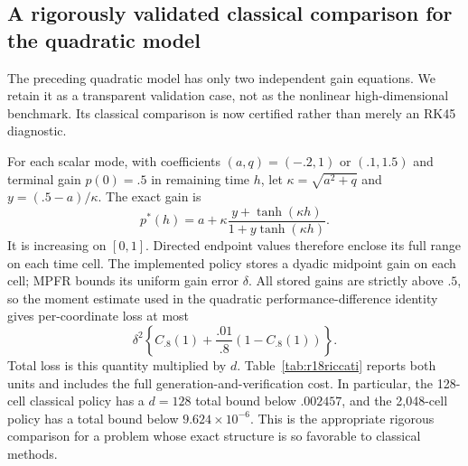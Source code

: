 \subsection{A rigorously validated classical comparison for the quadratic model}\label{sec:validatedriccati}
The preceding quadratic model has only two independent gain equations. We retain it as a transparent validation case, not as the nonlinear high-dimensional benchmark. Its classical comparison is now certified rather than merely an RK45 diagnostic.

For each scalar mode, with coefficients $(a,q)=(-.2,1)$ or $(.1,1.5)$ and terminal gain $p(0)=.5$ in remaining time $h$, let $\kappa=\sqrt{a^2+q}$ and $y=(.5-a)/\kappa$. The exact gain is
\[
 p^*(h)=a+\kappa\frac{y+\tanh(\kappa h)}{1+y\tanh(\kappa h)}.
\]
It is increasing on $[0,1]$. Directed endpoint values therefore enclose its full range on each time cell. The implemented policy stores a dyadic midpoint gain on each cell; MPFR bounds its uniform gain error $\delta$. All stored gains are strictly above $.5$, so the moment estimate used in the quadratic performance-difference identity gives per-coordinate loss at most
\[
 \delta^2\left\{C_{.8}(1)+\frac{.01}{.8}(1-C_{.8}(1))\right\}.
\]
Total loss is this quantity multiplied by $d$. Table~\ref{tab:r18riccati} reports both units and includes the full generation-and-verification cost. In particular, the 128-cell classical policy has a $d=128$ total bound below $.002457$, and the 2,048-cell policy has a total bound below $9.624\times10^{-6}$. This is the appropriate rigorous comparison for a problem whose exact structure is so favorable to classical methods.

